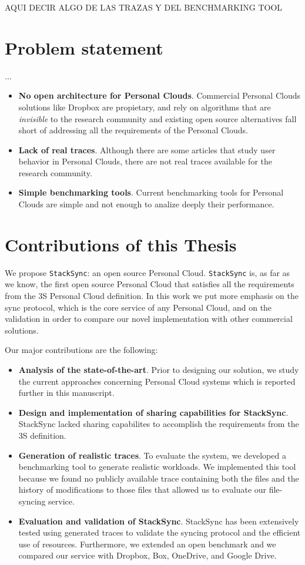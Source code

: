 AQUI DECIR ALGO DE LAS TRAZAS Y DEL BENCHMARKING TOOL

\section{Problem statement}
...
\begin{itemize}
	\item \textbf{No open architecture for Personal Clouds}. Commercial Personal Clouds solutions like Dropbox
	are propietary, and rely on algorithms that are \textit{invisible} to the research community and existing open source alternatives fall short of addressing all the requirements of the Personal Clouds.
	\item \textbf{Lack of real traces}. Although there are some articles that study user behavior in Personal Clouds,
	there are not real traces available for the research community.
	\item \textbf{Simple benchmarking tools}. Current benchmarking tools for Personal Clouds are simple and not enough to
	analize deeply their performance.
\end{itemize}

\section{Contributions of this Thesis}
We propose \texttt{StackSync}: an open source Personal Cloud. \texttt{StackSync} is, as far as we know, the first
open source Personal Cloud that satisfies all the requirements from the 3S Personal Cloud definition. In this work we put more emphasis on the sync protocol, which is the core service of any Personal Cloud, and on the validation in order to compare our novel implementation with other commercial solutions.

Our major contributions are the following:

\begin{itemize}
	\item \textbf{Analysis of the state-of-the-art}. Prior to designing our solution, we study the current approaches concerning Personal Cloud systems which is reported further in this manuscript.
	\item \textbf{Design and implementation of sharing capabilities for StackSync}. StackSync lacked sharing capabilites to accomplish the requirements from the 3S definition. 
	\item \textbf{Generation of realistic traces}. To evaluate the system, we developed a benchmarking tool to generate
realistic workloads. We implemented this tool because we found no publicly available trace containing both 
the files and the history of modifications to those files that allowed us to evaluate our file-syncing service.
	\item \textbf{Evaluation and validation of StackSync}. StackSync has been extensively tested using generated traces to validate the syncing protocol and the efficient use of resources. Furthermore, we extended an open benchmark \cite{drago2013benchmarking} and we compared our service with Dropbox, Box, OneDrive, and Google Drive.
\end{itemize}

